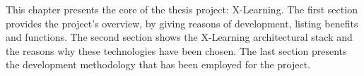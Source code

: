 This chapter presents the core of the thesis project: X-Learning.
The first section provides the project’s overview, by giving reasons of development, listing benefits and functions. The second section shows the X-Learning architectural stack and the reasons why these technologies have been chosen. The last section presents the development methodology that has been employed for the project.